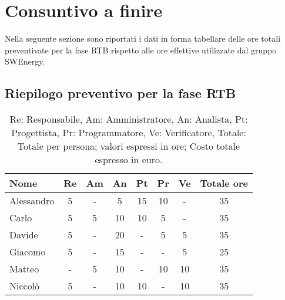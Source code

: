 \section{Consuntivo a finire}

Nella seguente sezione sono riportati i dati in forma tabellare 
delle ore totali preventivate per la fase RTB rispetto alle ore effettive 
utilizzate dal gruppo SWEnergy.


\subsection{Riepilogo preventivo per la fase RTB}

\begin{table}[H]
	\centering
	\begin{tabular}{l|c|c|c|c|c|c|c}
		\textbf{Nome}         & \textbf{Re} & \textbf{Am} & \textbf{An} & \textbf{Pt} & \textbf{Pr} & \textbf{Ve} & \textbf{Totale ore} \\
		\hline
		Alessandro            & 5           & -           & 5           & 15           & 10           & -           & 35              \\
		Carlo                 & 5           & 5           & 10           & 10           & 5           & -           & 35              \\
		Davide                & 5           & -           & 20          & -           & 5           & 5           & 35              \\
		Giacomo               & 5           & -           & 15          & -           & -           & 5           & 25              \\
		Matteo                & -           & 5           & 10          & -           & 10           & 10           & 35              \\
		Niccolò               & 5           & -           & 10          & 10           & -           & 10           & 35              \\
		\hline
	\end{tabular}
	\caption{Re: Responsabile, Am: Amministratore, An: Analista, Pt: Progettista,
		Pr: Programmatore, Ve: Verificatore, Totale: Totale per persona; valori espressi in ore; Costo totale espresso in euro.}
\end{table}

